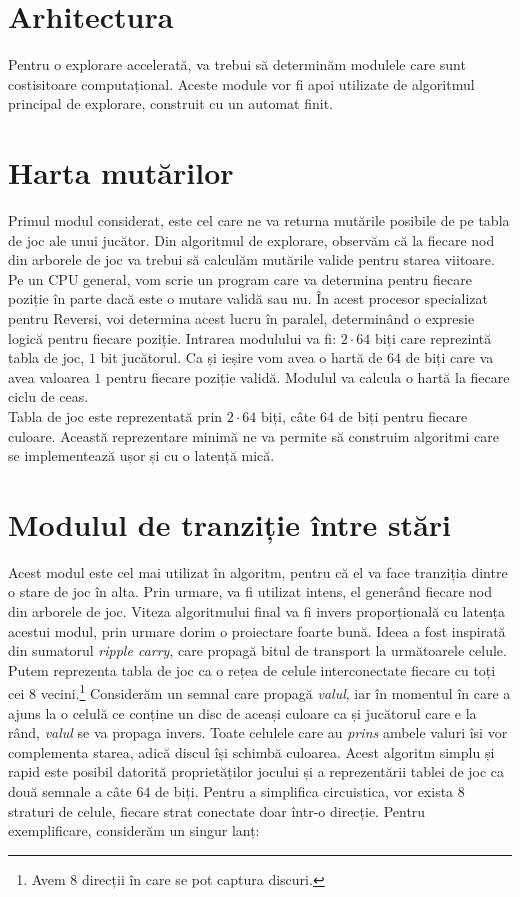 \documentclass[11pt,twocolumn,a4paper]{article}
\begin{document}
\section*{Arhitectura}
Pentru o explorare accelerată, va trebui să determinăm modulele care sunt costisitoare computațional. Aceste module vor fi apoi utilizate de algoritmul principal de explorare, construit cu un automat finit.
\section*{Harta mutărilor}
Primul modul considerat, este cel care ne va returna mutările posibile de pe tabla de joc ale unui jucător. Din algoritmul de explorare, observăm că la fiecare nod din arborele de joc va trebui să calculăm mutările valide pentru starea viitoare. Pe un CPU general, vom scrie un program care va determina pentru fiecare poziție în parte dacă este o mutare validă sau nu. În acest procesor specializat pentru Reversi, voi determina acest lucru în paralel, determinând o expresie logică pentru fiecare poziție. Intrarea modulului va fi: $2 \cdot 64$ biți care reprezintă tabla de joc, $1$ bit jucătorul. Ca și ieșire vom avea o hartă de $64$ de biți care va avea valoarea $1$ pentru fiecare poziție validă. Modulul va calcula o hartă la fiecare ciclu de ceas.\\
Tabla de joc este reprezentată prin $2 \cdot 64$ biți, câte $64$ de biți pentru fiecare culoare. Această reprezentare minimă ne va permite să construim algoritmi care se implementează ușor și cu o latență mică.
\section*{Modulul de tranziție între stări}
Acest modul este cel mai utilizat în algoritm, pentru că el va face tranziția dintre o stare de joc în alta. Prin urmare, va fi utilizat intens, el generând fiecare nod din arborele de joc. Viteza algoritmului final va fi invers proporțională cu latența acestui modul, prin urmare dorim o proiectare foarte bună. Ideea a fost inspirată din sumatorul \emph{ripple carry}, care propagă bitul de transport la următoarele celule\cite{Jean}. Putem reprezenta tabla de joc ca o rețea de celule interconectate fiecare cu toți cei $8$ vecini.\footnote{Avem $8$ direcții în care se pot captura discuri.} Considerăm un semnal care propagă \emph{valul}, iar în momentul în care a ajuns la o celulă ce conține un disc de aceași culoare ca și jucătorul care e la rând, \emph{valul} se va propaga invers. Toate celulele care au \emph{prins} ambele valuri îsi vor complementa starea, adică discul își schimbă culoarea. Acest algoritm simplu și rapid este posibil datorită proprietăților jocului și a reprezentării tablei de joc ca două semnale a câte $64$ de biți. Pentru a simplifica circuistica, vor exista $8$ straturi de celule, fiecare strat conectate doar într-o direcție. Pentru exemplificare, considerăm un singur lanț:
\end{document}
